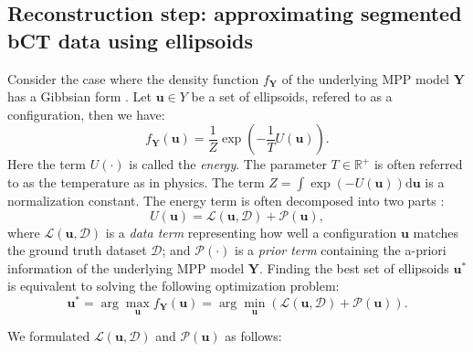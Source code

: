 \documentclass[journal]{IEEEtran}
\newcommand{\dd}[1]{\mathrm{d}#1}%
\begin{document}
\subsection{Reconstruction step: approximating segmented bCT data
  using ellipsoids}
\label{sec:reconstr-step:-appr}

Consider the case where the density function $f_{\mathbf{Y}}$ of the
underlying MPP model $\mathbf{Y}$ has a Gibbsian form
\cite{moller2007modern}. Let $\mathbf{u} \in Y$ be a set of
ellipsoids, refered to as a configuration, then we have:
\begin{equation}
  \label{eq:gibbs-density}
  f_{\mathbf{Y}}(\mathbf{u}) = \frac{1}{Z} \exp \left( - \frac{1}{T}
    U(\mathbf{u}) \right).
\end{equation}
Here the term $U(\cdot)$ is called the \textit{energy}. The parameter
$T \in \mathbb{R}^{+}$ is often referred to as the temperature as in
physics. The term
$Z = \int \exp \left( -U(\mathbf{u}) \right) \dd \mathbf{u}$ is a
normalization constant. The energy term is often decomposed into two
parts \cite{lafarge2010geometric} \cite{descombes2009object}:
\begin{equation}
  \label{mpp-energy}
  U(\mathbf{u}) = \mathcal{L}(\mathbf{u}, \mathcal{D})
  + \mathcal{P} (\mathbf{u}),
\end{equation}
where $\mathcal{L}(\mathbf{u}, \mathcal{D})$ is a \textit {data term}
representing how well a configuration $\mathbf{u}$ matches the ground
truth dataset $\mathcal{D}$; and $\mathcal{P} (\cdot)$ is a \textit
{prior term} containing the a-priori information of the underlying MPP
model $\mathbf{Y}$. Finding the best set of ellipsoids
$\mathbf{u}^{*}$ is equivalent to solving the following optimization
problem:
\begin{equation}
  \label{mpp-opt-energy}
  \mathbf{u}^{*}
  = \arg \max_{\mathbf{u}}{f_{\mathbf{Y}}(\mathbf{u})}
  = \arg\min_ {\mathbf{u}} \left( \mathcal{L}(\mathbf{u},
    \mathcal{D}) + \mathcal{P} (\mathbf{u}) \right).
\end{equation}

We formulated $\mathcal{L}(\mathbf{u}, \mathcal{D})$ and
$\mathcal{P} (\mathbf{u})$ as follows:
\end{document}

